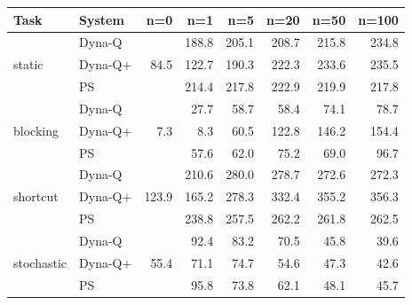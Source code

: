 \begin{tabular}{llrrrrrr}
\toprule
Task & System & n=0 & n=1 & n=5 & n=20 & n=50 & n=100 \\
\midrule
\multirow{3}{*}{static} & Dyna-Q & \multirow{3}{*}{84.5} & 188.8 & 205.1 & 208.7 & 215.8 & 234.8 \\
 & Dyna-Q+ &  & 122.7 & 190.3 & 222.3 & 233.6 & 235.5 \\
 & PS &  & 214.4 & 217.8 & 222.9 & 219.9 & 217.8 \\
\midrule
\multirow{3}{*}{blocking} & Dyna-Q & \multirow{3}{*}{7.3} & 27.7 & 58.7 & 58.4 & 74.1 & 78.7 \\
 & Dyna-Q+ &  & 8.3 & 60.5 & 122.8 & 146.2 & 154.4 \\
 & PS &  & 57.6 & 62.0 & 75.2 & 69.0 & 96.7 \\
\midrule
\multirow{3}{*}{shortcut} & Dyna-Q & \multirow{3}{*}{123.9} & 210.6 & 280.0 & 278.7 & 272.6 & 272.3 \\
 & Dyna-Q+ &  & 165.2 & 278.3 & 332.4 & 355.2 & 356.3 \\
 & PS &  & 238.8 & 257.5 & 262.2 & 261.8 & 262.5 \\
\midrule
\multirow{3}{*}{stochastic} & Dyna-Q & \multirow{3}{*}{55.4} & 92.4 & 83.2 & 70.5 & 45.8 & 39.6 \\
 & Dyna-Q+ &  & 71.1 & 74.7 & 54.6 & 47.3 & 42.6 \\
 & PS &  & 95.8 & 73.8 & 62.1 & 48.1 & 45.7 \\
\bottomrule
\end{tabular}
